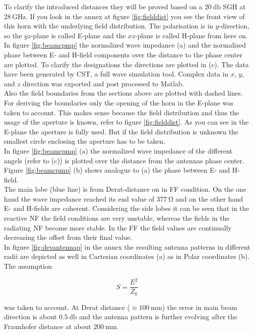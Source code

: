To clarify the introduced distances they will be proved based on a $\SI{20}{\decibel}$ \ac{SGH} at $\SI{28}{\giga\hertz}$. If you look in the annex at figure \ref{fig:fielddist} you see the front view of this horn with the underlying field distribution. The polarisation is in $y$-direction, so the $yz$-plane is called E-plane and the $xz$-plane is called H-plane from here on.\\
In figure \ref{fig:beamcpmp} the normalized wave impedance (a) and the normalized phase between E- and H-field components over the distance to the phase center are plotted. To clarify the designations the directions are plotted in (c). The data have been generated by CST\texttrademark , a full wave simulation tool. Complex data in $x$, $y$, and $z$ direction was exported and post processed to Matlab\texttrademark{}.\\
Also the field boundaries from the sections above are plotted with dashed lines. For deriving the boundaries only the opening of the horn in the E-plane was taken to account. This makes sense because the field distribution and thus the usage of the aperture is known, refer to figure \ref{fig:fielddist}. As you can see in the E-plane the aperture is fully used. But if the field distribution is unknown the smallest circle enclosing the aperture has to be taken.\\
In figure \ref{fig:beamcpmp} (a) the normalized wave impedance of the different angels (refer to (c)) is plotted over the distance from the antennas phase center. Figure \ref{fig:beamcpmp} (b) shows analogue to (a) the phase between E- and H-field.\\
The main lobe (blue line) is from Derat-distance on in \ac{FF} condition. On the one hand the wave impedance reached its end value of $\SI{377}{\ohm}$ and on the other hand E- and H-fields are coherent. Considering the side lobes it can be seen that in the reactive \ac{NF} the field conditions are very unstable, whereas the fields in the radiating \ac{NF} become more stable. In the \ac{FF} the field values are continually decreasing the offset from their final value.\\
In figure \ref{fig:devantennap} in the annex the resulting antenna patterns in different radii are depicted as well in Cartesian coordinates (a) as in Polar coordinates (b). The assumption 

\begin{equation}
S = \frac{E^2}{Z_0}
\end{equation}

was taken to account. At Derat distance ($\approx\SI{100}{\milli\meter}$) the error in main beam direction is about $\SI{0.5}{\decibel}$ and the antenna pattern is further evolving after the Fraunhofer distance at about $\SI{200}{\milli\meter}$.


